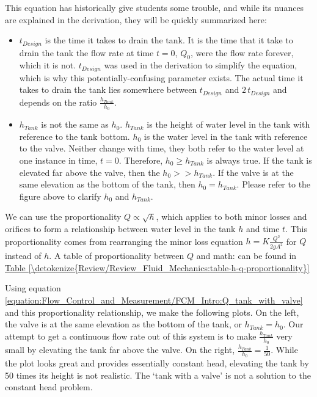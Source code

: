 \documentclass[letterpaper,10pt,english]{sphinxmanual}
\begin{document}
This equation has historically give students some trouble, and while its nuances are explained in the derivation, they will be quickly summarized here:
\begin{itemize}
\item {} 
\(t_{Design}\) is  the time it takes to drain the tank. It is the time that it  take to drain the tank  the flow rate at time \(t = 0\), \(Q_0\), were the flow rate forever, which it is not. \(t_{Design}\) was used in the derivation to simplify the equation, which is why this potentially-confusing parameter exists. The actual time it takes to drain the tank lies somewhere between \(t_{Design}\) and \(2 \, t_{Design}\) and depends on the ratio \(\frac{h_{Tank}}{h_0}\).

\item {} 
\(h_{Tank}\) is not the same as \(h_{0}\). \(h_{Tank}\) is the height of water level in the tank with reference to the tank bottom. \(h_{0}\) is the water level in the tank with reference to the valve. Neither change with time, they both refer to the water level at one instance in time, \(t = 0\). Therefore, \(h_{0} \geq h_{Tank}\) is always true. If the tank is elevated far above the valve, then the \(h_{0} > > h_{Tank}\). If the valve is at the same elevation as the bottom of the tank, then \(h_{0} = h_{Tank}\). Please refer to the figure above to clarify \(h_{0}\) and \(h_{Tank}\).

\end{itemize}

We can use the proportionality \(Q \propto \sqrt{h}\), which applies to both minor losses and orifices to form a relationship between water level in the tank \(h\) and time \(t\). This proportionality comes from rearranging the minor loss equation \(h = K \frac{Q^2}{2 g A^2}\) for \(Q\) instead of \(h\). A table of proportionality between \(Q\) and math: can be found in \hyperref[\detokenize{Review/Review_Fluid_Mechanics:table-h-q-proportionality}]{Table \ref{\detokenize{Review/Review_Fluid_Mechanics:table-h-q-proportionality}}}

Using equation \eqref{equation:Flow_Control_and_Measurement/FCM_Intro:Q_tank_with_valve} and this proportionality relationship, we make the following plots. On the left, the valve is at the same elevation as the bottom of the tank, or \(h_{Tank} = h_0\). Our attempt to get a continuous flow rate out of this system is to make \(\frac{h_{Tank}}{h_0}\) very small by elevating the tank far above the valve. On the right, \(\frac{h_{Tank}}{h_0} = \frac{1}{50}\). While the plot looks great and provides essentially constant head, elevating the tank by 50 times its height is not realistic. The ‘tank with a valve’ is not a solution to the constant head problem.
\end{document}
